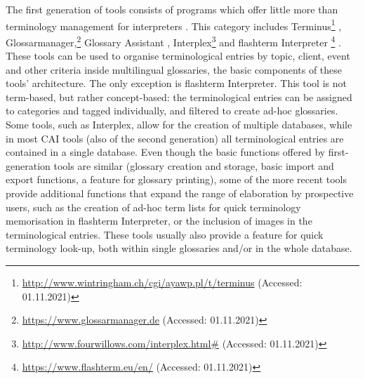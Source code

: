 The first generation of tools consists of programs which offer little more than terminology management for interpreters \citep[212]{hansen2012nutzbarkeit}. This category includes Terminus\footnote{\url{http://www.wintringham.ch/cgi/ayawp.pl/t/terminus} (Accessed: 01.11.2021)} \citep{terminus}, Glossarmanager,\footnote{\url{https://www.glossarmanager.de} (Accessed: 01.11.2021)} Glossary Assistant \citep{glossaryassistant}, Interplex\footnote{\url{http://www.fourwillows.com/interplex.html\#} (Accessed: 01.11.2021)} \citep{sand2003manage,sand2010new} and flashterm Interpreter \footnote{\url{https://www.flashterm.eu/en/} (Accessed: 01.11.2021)} \citep{flashterm}. These tools can be used to organise terminological entries by topic, client, event and other criteria inside multilingual glossaries, the basic components of these tools' architecture. The only exception is flashterm Interpreter. This tool is not term-based, but rather concept-based: the terminological entries can be assigned to categories and tagged individually, and filtered to create ad-hoc glossaries. Some tools, such as Interplex, allow for the creation of multiple databases, while in most CAI tools (also of the second generation) all terminological entries are contained in a single database. Even though the basic functions offered by first-generation tools are similar (glossary creation and storage, basic import and export functions, a feature for glossary printing), some of the more recent tools provide additional functions that expand the range of elaboration by prospective users, such as the creation of ad-hoc term lists for quick terminology memorisation in flashterm Interpreter, or the inclusion of images in the terminological entries. These tools usually also provide a feature for quick terminology look-up, both within single glossaries and/or in the whole database.

